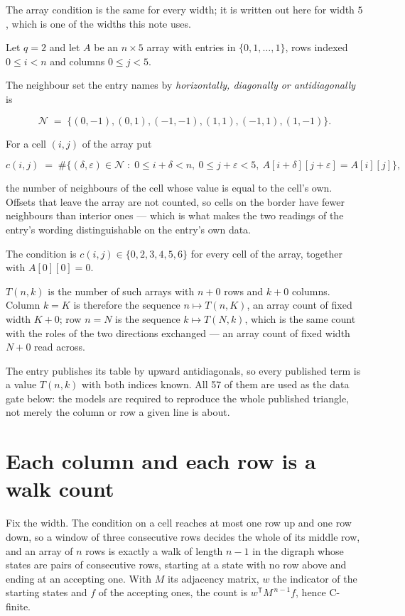 \documentclass[11pt]{article}
\theoremstyle{definition}
\begin{document}
The array condition is the same for every width; it is written out here for width $5$, which is one of the widths this note uses.

Let $q = 2$ and let $A$ be an $n \times 5$ array with entries in $\{0,1,\dots,1\}$, rows indexed $0 \le i < n$ and columns $0 \le j < 5$.

The neighbour set the entry names by {\itshape horizontally, diagonally or antidiagonally} is

\[\mathcal{N} \;=\; \{(0,-1), (0,1), (-1,-1), (1,1), (-1,1), (1,-1)\}.\]

For a cell $(i,j)$ of the array put

\[c(i,j) \;=\; \#\bigl\{(\delta,\varepsilon)\in\mathcal{N} \;:\; 0\le i+\delta<n,\ 0\le j+\varepsilon<5,\ A[i+\delta][j+\varepsilon] = A[i][j]\bigr\},\]

the number of neighbours of the cell whose value is equal to the cell's own. Offsets that leave the array are not counted, so cells on the border have fewer neighbours than interior ones --- which is what makes the two readings of the entry's wording distinguishable on the entry's own data.

The condition is $c(i,j) \in \{0, 2, 3, 4, 5, 6\}$ for every cell of the array, together with $A[0][0]=0$.

$T(n,k)$ is the number of such arrays with $n + 0$ rows and $k + 0$ columns. Column $k = K$ is therefore the sequence $n \mapsto T(n,K)$, an array count of fixed width $K + 0$; row $n = N$ is the sequence $k \mapsto T(N,k)$, which is the same count with the roles of the two directions exchanged --- an array count of fixed width $N + 0$ read across.

The entry publishes its table by upward antidiagonals, so every published term is a value $T(n,k)$ with both indices known. All 57 of them are used as the data gate below: the models are required to reproduce the whole published triangle, not merely the column or row a given line is about.

\section{Each column and each row is a walk count}

Fix the width. The condition on a cell reaches at most one row up and one row down, so a window of three consecutive rows decides the whole of its middle row, and an array of $n$ rows is exactly a walk of length $n-1$ in the digraph whose states are pairs of consecutive rows, starting at a state with no row above and ending at an accepting one. With $M$ its adjacency matrix, $w$ the indicator of the starting states and $f$ of the accepting ones, the count is $w^{\mathsf T}M^{\,n-1}f$, hence C-finite.
\end{document}
